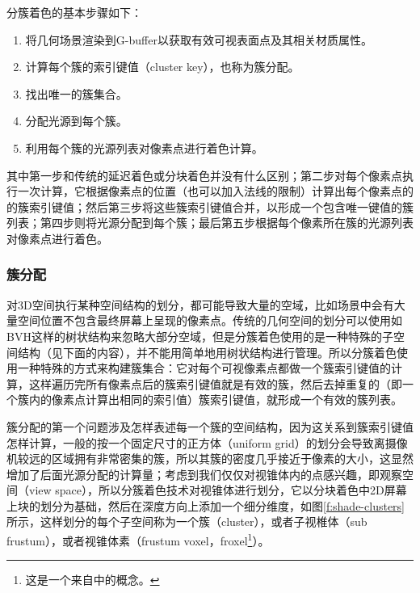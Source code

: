 分簇着色的基本步骤如下：

\begin{enumerate}
	\item 将几何场景渲染到G-buffer以获取有效可视表面点及其相关材质属性。
	\item 计算每个簇的索引键值（cluster key），也称为簇分配。
	\item 找出唯一的簇集合。
	\item 分配光源到每个簇。
	\item 利用每个簇的光源列表对像素点进行着色计算。
\end{enumerate}

其中第一步和传统的延迟着色或分块着色并没有什么区别；第二步对每个像素点执行一次计算，它根据像素点的位置（也可以加入法线的限制）计算出每个像素点的的簇索引键值；然后第三步将这些簇索引键值合并，以形成一个包含唯一键值的簇列表；第四步则将光源分配到每个簇；最后第五步根据每个像素所在簇的光源列表对像素点进行着色。





\subsubsection{簇分配}
对3D空间执行某种空间结构的划分，都可能导致大量的空域，比如场景中会有大量空间位置不包含最终屏幕上呈现的像素点。传统的几何空间的划分可以使用如BVH这样的树状结构来忽略大部分空域，但是分簇着色使用的是一种特殊的子空间结构（见下面的内容），并不能用简单地用树状结构进行管理。所以分簇着色使用一种特殊的方式来构建簇集合：它对每个可视像素点都做一个簇索引键值的计算，这样遍历完所有像素点后的簇索引键值就是有效的簇，然后去掉重复的（即一个簇内的像素点计算出相同的索引值）簇索引键值，就形成一个有效的簇列表。

簇分配的第一个问题涉及怎样表述每一个簇的空间结构，因为这关系到簇索引键值怎样计算，一般的按一个固定尺寸的正方体（uniform grid）的划分会导致离摄像机较远的区域拥有非常密集的簇，所以其簇的密度几乎接近于像素的大小，这显然增加了后面光源分配的计算量；考虑到我们仅仅对视锥体内的点感兴趣，即观察空间（view space），所以分簇着色技术对视锥体进行划分，它以分块着色中2D屏幕上块的划分为基础，然后在深度方向上添加一个细分维度，如图\ref{f:shade-clusters}所示，这样划分的每个子空间称为一个簇（cluster），或者子视椎体（sub frustum），或者视锥体素（frustum voxel，froxel\footnote{这是一个来自\cite{a:Learningfromfailure}中的概念。}）。

